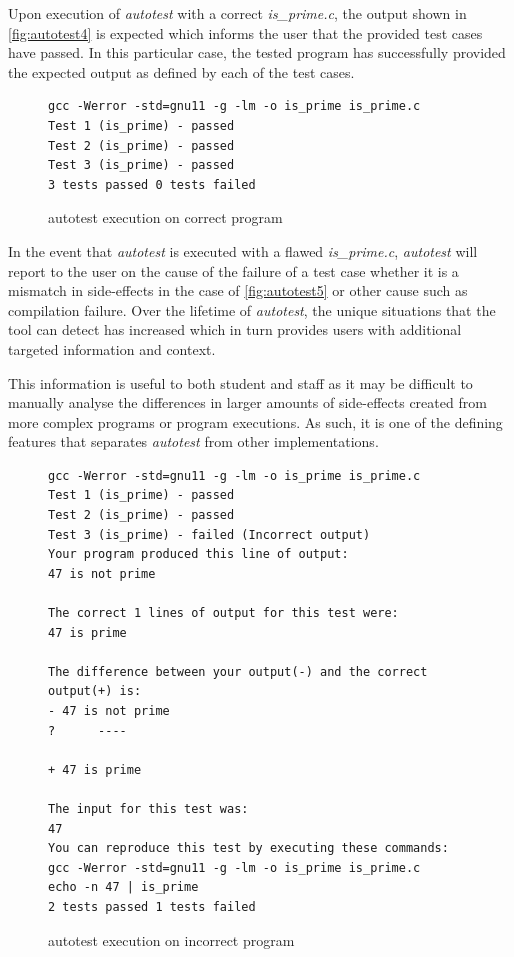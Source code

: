 \documentclass[hidelinks, 12pt]{extreport}
\begin{document}
Upon execution of \textit{autotest} with a correct \textit{is\_prime.c}, the output shown in \autoref{fig:autotest4} is expected which informs the user that the provided test cases have passed. In this particular case, the tested program has successfully provided the expected output as defined by each of the test cases.

\begin{figure}[h]
	\centering
	\begin{lstlisting}[breaklines=true, linewidth=\linewidth]
gcc -Werror -std=gnu11 -g -lm -o is_prime is_prime.c
Test 1 (is_prime) - passed
Test 2 (is_prime) - passed
Test 3 (is_prime) - passed
3 tests passed 0 tests failed
	\end{lstlisting}
	\caption{autotest execution on correct program}
	\label{fig:autotest4}
\end{figure}

In the event that \textit{autotest} is executed with a flawed \textit{is\_prime.c}, \textit{autotest} will report to the user on the cause of the failure of a test case whether it is a mismatch in side-effects in the case of \autoref{fig:autotest5} or other cause such as compilation failure. Over the lifetime of \textit{autotest}, the unique situations that the tool can detect has increased which in turn provides users with additional targeted information and context.

This information is useful to both student and staff as it may be difficult to manually analyse the differences in larger amounts of side-effects created from more complex programs or program executions.  As such, it is one of the defining features that separates \textit{autotest} from other implementations.

\begin{figure}[h]
	\centering
	\begin{lstlisting}[breaklines=true, linewidth=\linewidth]
gcc -Werror -std=gnu11 -g -lm -o is_prime is_prime.c
Test 1 (is_prime) - passed
Test 2 (is_prime) - passed
Test 3 (is_prime) - failed (Incorrect output)
Your program produced this line of output:
47 is not prime

The correct 1 lines of output for this test were:
47 is prime

The difference between your output(-) and the correct output(+) is:
- 47 is not prime
?      ----

+ 47 is prime

The input for this test was:
47
You can reproduce this test by executing these commands:
gcc -Werror -std=gnu11 -g -lm -o is_prime is_prime.c
echo -n 47 | is_prime
2 tests passed 1 tests failed
	\end{lstlisting}
	\caption{autotest execution on incorrect program}
	\label{fig:autotest5}
\end{figure}
\end{document}
